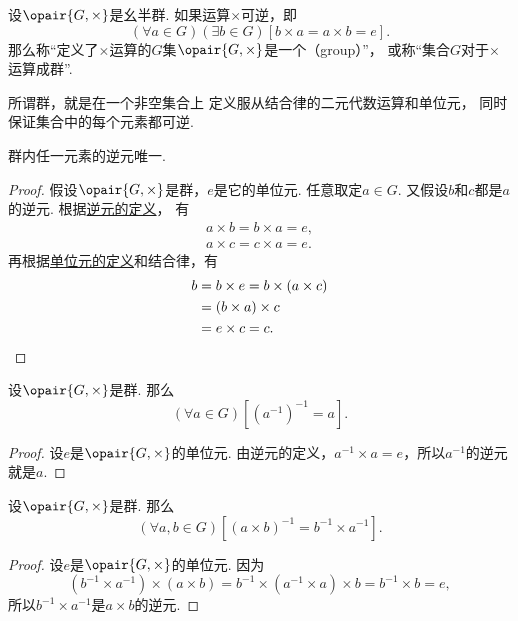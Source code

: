 \begin{definition}\label{definition:抽象代数.群的定义}
设\(\opair{G,\times}\)是幺半群.
如果运算\(\times\)可逆，即\begin{equation*}
	(\forall a \in G)(\exists b \in G)
	[b \times a = a \times b = e].
\end{equation*}
那么称“定义了\(\times\)运算的\(G\)集\(\opair{G,\times}\)是一个（group）”，
或称“集合\(G\)对于\(\times\)运算成群”.
\end{definition}
\begin{remark}
所谓群，就是在一个非空集合上
定义服从结合律的二元代数运算和单位元，
同时保证集合中的每个元素都可逆.
\end{remark}

\begin{theorem}\label{theorem:抽象代数.群内任一元的逆元唯一}
群内任一元素的逆元唯一.
\begin{proof}
假设\(\opair{G,\times}\)是群，\(e\)是它的单位元.
任意取定\(a \in G\).
又假设\(b\)和\(c\)都是\(a\)的逆元.
根据\hyperref[definition:抽象代数.群的定义]{逆元的定义}，
有\begin{gather*}
    a \times b = b \times a = e, \\
    a \times c = c \times a = e.
\end{gather*}
再根据\hyperref[definition:抽象代数.幺半群的定义]{单位元的定义}和结合律，有\begin{align*}
    b &= b \times e
	= b \times (a \times c) \\
    &= (b \times a) \times c \\
    &= e \times c
	= c.
	\qedhere
\end{align*}
\end{proof}
\end{theorem}

\begin{theorem}\label{theorem:抽象代数.群内任一元的逆的逆是它本身}
设\(\opair{G,\times}\)是群.
那么\begin{equation*}
	(\forall a\in G)[(a^{-1})^{-1}=a].
\end{equation*}
\begin{proof}
设\(e\)是\(\opair{G,\times}\)的单位元.
由逆元的定义，\(a^{-1} \times a = e\)，所以\(a^{-1}\)的逆元就是\(a\).
\end{proof}
\end{theorem}

\begin{theorem}\label{theorem:抽象代数.群内元素的乘积的逆}
设\(\opair{G,\times}\)是群.
那么\begin{equation*}
	(\forall a,b\in G)[
		(a \times b)^{-1}
		= b^{-1} \times a^{-1}
	].
\end{equation*}
\begin{proof}
设\(e\)是\(\opair{G,\times}\)的单位元.
因为\begin{equation*}
	(b^{-1} \times a^{-1})\times(a \times b)
	= b^{-1} \times (a^{-1} \times a) \times b
	= b^{-1} \times b
	= e,
\end{equation*}
所以\(b^{-1} \times a^{-1}\)是\(a \times b\)的逆元.
\end{proof}
\end{theorem}

